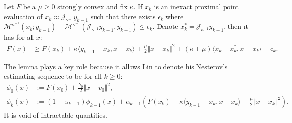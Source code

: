 \documentclass[12pt]{article}
\begin{document}
    \begin{lemma}\label{lemma:lin-ixct-prox-ineq}
        Let $F$ be a $\mu\ge 0$ strongly convex and fix $\kappa$. 
        If $x_k$ is an inexact proximal point evaluation of $x_k \approx \mathcal J_{\kappa^{-1}} y_{k - 1}$ such that there exists $\epsilon_k$ where $\mathcal M^{\kappa^{-1}}(x_k; y_{k - 1}) - \mathcal M^{\kappa^{-1}}(\mathcal J_{\kappa^{-1}} y_{k - 1}, y_{k - 1}) \le \epsilon_k$. 
        Denote $x_k^* = \mathcal J_{\kappa^{-1}} y_{k - 1}$, then it has for all $x$: 
        \begin{align*}
            F(x) &\ge 
            F(x_k) + \kappa \langle y_{k - 1} - x_k, x - x_k\rangle
            + \frac{\mu}{2}\Vert x - x_k\Vert^2 
            + (\kappa + \mu)\langle  x_k - x_k^*, x - x_k\rangle 
            - \epsilon_k.
        \end{align*}
    \end{lemma}
    \begin{remark}
        The lemma plays a key role because it allows Lin to denote his Nesterov's estimating sequence to be for all $k \ge0$: 
        \begin{align*}
            \phi_0(x) &:= F(x_0) + \frac{\gamma_0}{2}\Vert x - v_0\Vert^2, 
            \\
            \phi_k(x) &:= 
            (1 - \alpha_{k - 1})\phi_{k - 1}(x)
            + \alpha_{k - 1}\left(
                F(x_k) + \kappa\langle y_{k - 1} - x_k, x - x_k \rangle
                + \frac{\mu}{2}\Vert x - x_k\Vert^2
            \right). 
        \end{align*}
        It is void of intractable quantities. 
    \end{remark}
    
\end{document}
